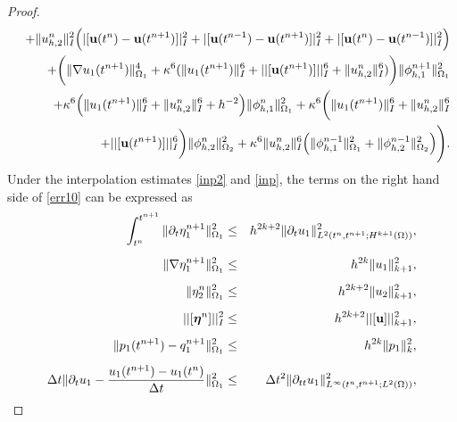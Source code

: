 \documentclass[10pt]{article}%
\numberwithin{equation}{section}
\begin{document}
\begin{proof}
\begin{eqnarray}
	&&+\|u_{h,2}^n\|_I^2\Big(|[{\bf u}(t^{n})-{\bf u}(t^{n+1})]|_I^2+|[{\bf u}(t^{n-1})-{\bf u}(t^{n+1})]|_I^2+|[{\bf u}(t^{n})-{\bf u}(t^{n-1})]|_I^2\Big)\nonumber\allowdisplaybreaks\\
	&&+\bigg(\|\nabla u_{1}(t^{n+1})\|_{\Omega_1}^{4}+\kappa^{6}(\|u_1(t^{n+1})\|^{6}_I+||[{\bf u}(t^{n+1})]||^{6}_I+\|u_{h,2}^n\|^{6}_I)\bigg)\|\phi_{h,1}^{n+1}\|_{\Omega_1}^2\nonumber\\&&+\kappa^{6}\Big(\|u_1(t^{n+1})\|^{6}_I+\|u_{h,2}^n\|^{6}_I+h^{-2}\Big)\|\phi_{h,1}^n\|^2_{\Omega_1}+\kappa^{6}\bigg(\|u_1(t^{n+1})\|^{6}_I+\|u_{h,2}^n\|^{6}_I\nonumber\allowdisplaybreaks\\&&+||[{\bf u}(t^{n+1})]||^{6}_I\bigg)\|\phi_{h,2}^n\|^2_{\Omega_2}+\kappa^{6}\|u_{h,2}^n\|^{6}_I\Big(\|{\bf \phi}_{h,1}^{n-1}\|^2_{\Omega_1}+\|{\bf \phi}_{h,2}^{n-1}\|^2_{\Omega_2}\Big)\allowdisplaybreaks
	\Bigg).\label{err10}
	\end{eqnarray}
	Under the interpolation estimates \eqref{inp2} and \eqref{inp}, the terms on the right hand side of \eqref{err10} can be expressed as
	\begin{eqnarray}
	\int_{t^n}^{t^{n+1}}\|\partial_t\eta_{1}^{n+1}\|_{\Omega_1}^2&\leq&h^{2k+2}\|\partial_{t}u_1 \|_{L^2(t^n,t^{n+1};H^{k+1}(\Omega))}^2\label{err22},\\[5pt]\|\nabla \eta_1^{n+1}\|_{\Omega_1}^2&\leq&h^{2k}\|u_1\|_{k+1}^2,\\[5pt]
	\|\eta_{2}^n\|_{\Omega_1}^2&\leq&h^{2k+2}\|u_2\|_{k+1}^2,\\[5pt]
	||[\boldsymbol{\eta}^n]||^2_I&\leq&h^{2k+2}||[{\bf u}]||^2_{k+1},\\[5pt]
	\|p_1(t^{n+1})-q_1^{n+1}\|_{\Omega_1}^2&\leq&h^{2k}\|p_1\|_{k}^2, \label{pq}\\[5pt]
\Delta t\|\partial_{t}u_1-\frac{{u_1(t^{n+1})}-u_{1}(t^{n})}{\Delta t} \|_{\Omega_1}^2&\leq&\Delta t^2\|\partial_{tt}u_1\|_{L^\infty(t^n,t^{n+1};L^2(\Omega))}^2,\label{err23}
	\end{eqnarray}	

\end{proof}
\end{document}
